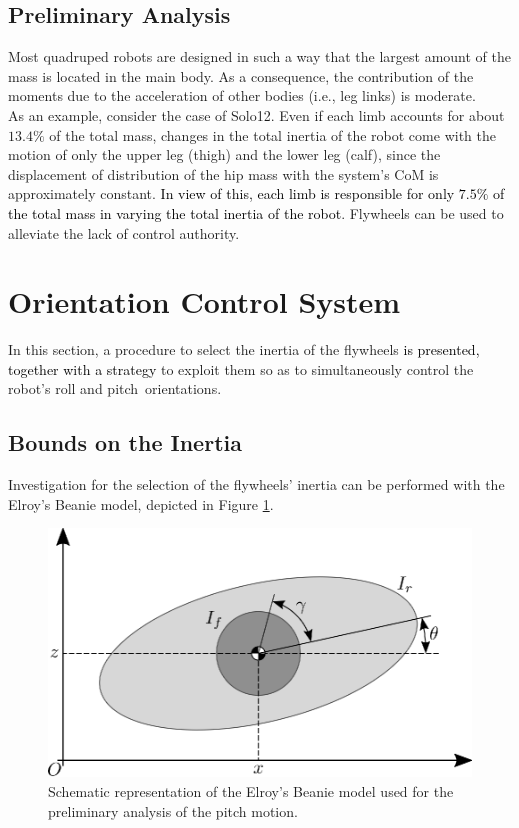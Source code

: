 \documentclass[sensors,article,accept,pdftex,moreauthors]{Definitions/mdpi}
\newcommand{\MF}[1]{\textcolor{black}{#1}}
\begin{document}
\subsection*{Preliminary Analysis}
Most quadruped robots are designed in such a way that the largest amount of the mass is located in the main body. As a consequence, the contribution of the moments due to the acceleration of other bodies (i.e., leg links) is moderate. \\
As an example, consider the case of Solo12. Even if each limb accounts for about $13.4\%$ of the total mass, changes in the total inertia of the robot come with the motion of only the upper leg (thigh) and the lower leg (calf), since the displacement of distribution of the hip mass with the system's CoM is approximately constant. \MF{In view of this, each limb is responsible for only $7.5\%$ of the total mass in varying the total inertia of the robot}. Flywheels can be used to alleviate the lack of control authority.


\section{Orientation Control System}
\label{sec:ocs}
In this section, a procedure to select the inertia of the flywheels \MF{is presented, together with a strategy} to exploit them so as to simultaneously control the robot's roll and p\mbox{itch orien}tations.


\subsection{Bounds on the Inertia}
Investigation for the selection of the flywheels' inertia can be performed with the Elroy's Beanie model, depicted in Figure \ref{fig:elroy-beanie}.
\begin{figure}[H]%
 
	\includegraphics[width=.7\linewidth]{figures/elroys-beanie.eps}
	\caption{\small Schematic representation of the Elroy's Beanie model used for the preliminary analysis of the pitch motion.}
	\label{fig:elroy-beanie}
\end{figure} 
\end{document}
